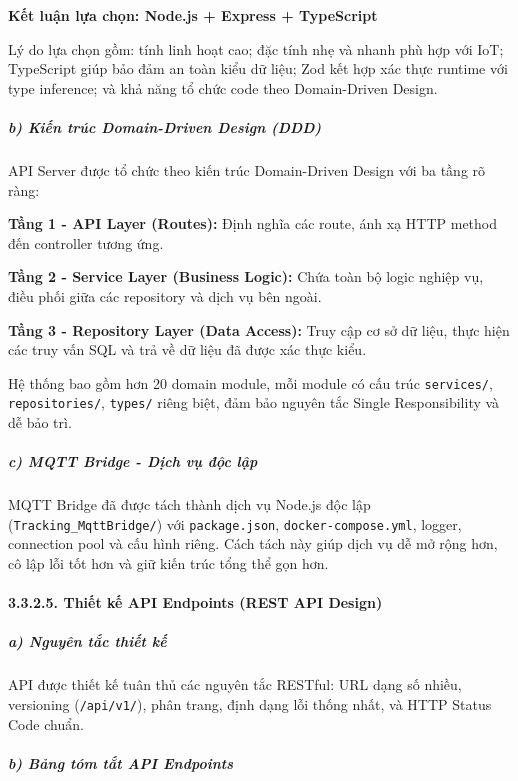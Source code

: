 \documentclass[a4paper]{extarticle}
\begin{document}
\textbf{Kết luận lựa chọn: Node.js + Express + TypeScript}

Lý do lựa chọn gồm: tính linh hoạt cao; đặc tính nhẹ và nhanh phù hợp
với IoT; TypeScript giúp bảo đảm an toàn kiểu dữ liệu; Zod kết hợp xác
thực runtime với type inference; và khả năng tổ chức code theo
Domain-Driven Design.

\subparagraph{b) Kiến trúc Domain-Driven Design
(DDD)}\label{b-kiux1ebfn-truxfac-domain-driven-design-ddd}

API Server được tổ chức theo kiến trúc Domain-Driven Design với ba tầng
rõ ràng:

\textbf{Tầng 1 - API Layer (Routes):} Định nghĩa các route, ánh xạ HTTP
method đến controller tương ứng.

\textbf{Tầng 2 - Service Layer (Business Logic):} Chứa toàn bộ logic
nghiệp vụ, điều phối giữa các repository và dịch vụ bên ngoài.

\textbf{Tầng 3 - Repository Layer (Data Access):} Truy cập cơ sở dữ
liệu, thực hiện các truy vấn SQL và trả về dữ liệu đã được xác thực
kiểu.

Hệ thống bao gồm hơn 20 domain module, mỗi module có cấu trúc
\texttt{services/}, \texttt{repositories/}, \texttt{types/} riêng biệt,
đảm bảo nguyên tắc Single Responsibility và dễ bảo trì.

\subparagraph{c) MQTT Bridge - Dịch vụ độc
lập}\label{c-mqtt-bridge---dux1ecbch-vux1ee5-ux111ux1ed9c-lux1eadp}

MQTT Bridge đã được tách thành dịch vụ Node.js độc lập
(\texttt{Tracking\_MqttBridge/}) với \texttt{package.json},
\texttt{docker-compose.yml}, logger, connection pool và cấu hình riêng.
Cách tách này giúp dịch vụ dễ mở rộng hơn, cô lập lỗi tốt hơn và giữ
kiến trúc tổng thể gọn hơn.

\paragraph{3.3.2.5. Thiết kế API Endpoints (REST API
Design)}\label{3235-thiux1ebft-kux1ebf-api-endpoints-rest-api-design}

\subparagraph{a) Nguyên tắc thiết
kế}\label{a-nguyuxean-tux1eafc-thiux1ebft-kux1ebf}

API được thiết kế tuân thủ các nguyên tắc RESTful: URL dạng số nhiều,
versioning (\texttt{/api/v1/}), phân trang, định dạng lỗi thống nhất, và
HTTP Status Code chuẩn.

\subparagraph{b) Bảng tóm tắt API
Endpoints}\label{b-bux1ea3ng-tuxf3m-tux1eaft-api-endpoints}
\end{document}
